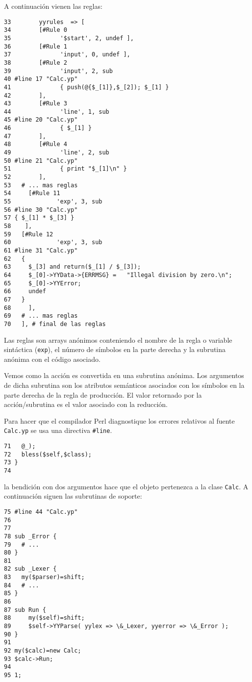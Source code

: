 A continuación vienen las reglas:
\begin{verbatim}
33        yyrules  => [
34        [#Rule 0
35              '$start', 2, undef ],
36        [#Rule 1
37              'input', 0, undef ],
38        [#Rule 2
39              'input', 2, sub
40 #line 17 "Calc.yp"
41              { push(@{$_[1]},$_[2]); $_[1] }
42        ],
43        [#Rule 3
44              'line', 1, sub
45 #line 20 "Calc.yp"
46              { $_[1] }
47        ],
48        [#Rule 4
49              'line', 2, sub
50 #line 21 "Calc.yp"
51              { print "$_[1]\n" }
52        ],
53   # ... mas reglas
54     [#Rule 11
55             'exp', 3, sub
56 #line 30 "Calc.yp"
57 { $_[1] * $_[3] }
58    ],
59   [#Rule 12
60             'exp', 3, sub
61 #line 31 "Calc.yp"
62   {
63     $_[3] and return($_[1] / $_[3]);
64     $_[0]->YYData->{ERRMSG} =   "Illegal division by zero.\n";
65     $_[0]->YYError;
66     undef
67   }
68     ],
69   # ... mas reglas
70   ], # final de las reglas
\end{verbatim}
Las reglas son arrays anónimos conteniendo el nombre de la regla o
variable sintáctica (\verb|exp|), el número de símbolos en la parte
derecha y la subrutina anónima con el código asociado.

Vemos como la acción es convertida en una subrutina anónima. 
Los argumentos de dicha subrutina son los atributos semánticos
asociados con los símbolos en la parte derecha de la regla de 
producción. El valor retornado por la acción/subrutina
es el valor asociado con la reducción.

Para hacer que 
el compilador Perl diagnostique los errores relativos al fuente 
\verb|Calc.yp| se usa una directiva \verb|#line|.


\begin{verbatim}
71   @_);
72   bless($self,$class);
73 }
74 
\end{verbatim}

la bendición con dos argumentos hace que el objeto pertenezca a la
clase \verb|Calc|. A continuación siguen las subrutinas de soporte:
\begin{verbatim}
75 #line 44 "Calc.yp" 
76 
77 
78 sub _Error {
79   # ...
80 }
81 
82 sub _Lexer {
83   my($parser)=shift;
84   # ...
85 }
86 
87 sub Run {
88     my($self)=shift;
89     $self->YYParse( yylex => \&_Lexer, yyerror => \&_Error );
90 }
91 
92 my($calc)=new Calc;
93 $calc->Run;
94 
95 1;
\end{verbatim}


